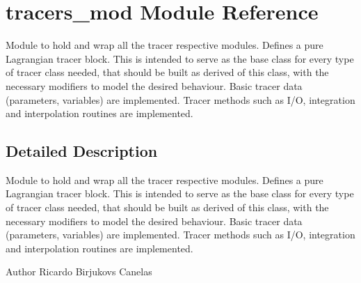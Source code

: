 \hypertarget{namespacetracers__mod}{}\section{tracers\+\_\+mod Module Reference}
\label{namespacetracers__mod}


Module to hold and wrap all the tracer respective modules. Defines a pure Lagrangian tracer block. This is intended to serve as the base class for every type of tracer class needed, that should be built as derived of this class, with the necessary modifiers to model the desired behaviour. Basic tracer data (parameters, variables) are implemented. Tracer methods such as I/O, integration and interpolation routines are implemented.  




\subsection{Detailed Description}
Module to hold and wrap all the tracer respective modules. Defines a pure Lagrangian tracer block. This is intended to serve as the base class for every type of tracer class needed, that should be built as derived of this class, with the necessary modifiers to model the desired behaviour. Basic tracer data (parameters, variables) are implemented. Tracer methods such as I/O, integration and interpolation routines are implemented. 

\begin{DoxyAuthor}{Author}
Ricardo Birjukovs Canelas 
\end{DoxyAuthor}
